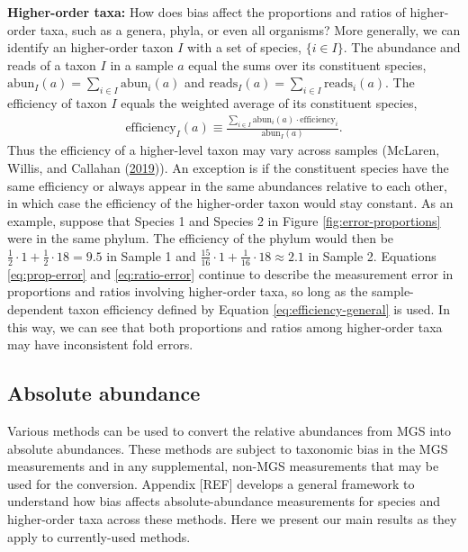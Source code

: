 \documentclass[
]{article}
\begin{document}
\textbf{Higher-order taxa:} How does bias affect the proportions and ratios of higher-order taxa, such as a genera, phyla, or even all organisms?
More generally, we can identify an higher-order taxon \(I\) with a set of species, \(\{i \in I\}\).
The abundance and reads of a taxon \(I\) in a sample \(a\) equal the sums over its constituent species, \(\text{abun}_{I}(a) = \sum_{i \in I}\text{abun}_{i}(a)\) and \(\text{reads}_{I}(a) = \sum_{i \in I}\text{reads}_{i}(a)\).
The efficiency of taxon \(I\) equals the weighted average of its constituent species,
\begin{align}
  \label{eq:efficiency-general}
  \text{efficiency}_I(a) 
    \equiv \frac{\sum_{i\in I}\text{abun}_i(a)\cdot \text{efficiency}_i}{\text{abun}_I(a)}.
\end{align}
Thus the efficiency of a higher-level taxon may vary across samples (McLaren, Willis, and Callahan (\protect\hyperlink{ref-mclaren2019cons}{2019})).
An exception is if the constituent species have the same efficiency or always appear in the same abundances relative to each other, in which case the efficiency of the higher-order taxon would stay constant.
As an example, suppose that Species 1 and Species 2 in Figure \ref{fig:error-proportions} were in the same phylum.
The efficiency of the phylum would then be \(\tfrac{1}{2} \cdot 1 + \tfrac{1}{2} \cdot 18 = 9.5\) in Sample 1 and \(\tfrac{15}{16} \cdot 1 + \tfrac{1}{16} \cdot 18 \approx 2.1\) in Sample 2.
Equations \eqref{eq:prop-error} and \eqref{eq:ratio-error} continue to describe the measurement error in proportions and ratios involving higher-order taxa, so long as the sample-dependent taxon efficiency defined by Equation \eqref{eq:efficiency-general} is used.
In this way, we can see that both proportions and ratios among higher-order taxa may have inconsistent fold errors.

\hypertarget{absolute-abundance}{%
\subsection{Absolute abundance}\label{absolute-abundance}}

Various methods can be used to convert the relative abundances from MGS into absolute abundances.
These methods are subject to taxonomic bias in the MGS measurements and in any supplemental, non-MGS measurements that may be used for the conversion.
Appendix {[}REF{]} develops a general framework to understand how bias affects absolute-abundance measurements for species and higher-order taxa across these methods.
Here we present our main results as they apply to currently-used methods.
\end{document}

